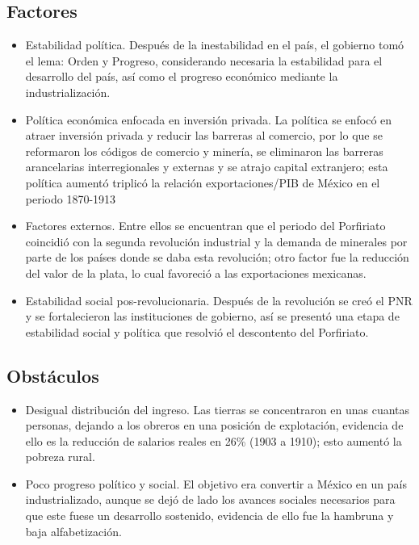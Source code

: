 \subsection{Factores}
\begin{itemize}
    \item Estabilidad política. Después de la inestabilidad en el país, el gobierno tomó el lema: Orden y Progreso, considerando necesaria la estabilidad para el desarrollo del país, así como el progreso económico mediante la industrialización.
    \item Política económica enfocada en inversión privada. La política se enfocó en atraer inversión privada y reducir las barreras al comercio, por lo que se reformaron los códigos de comercio y minería, se eliminaron las barreras arancelarias interregionales y externas y se atrajo capital extranjero; esta política aumentó triplicó la relación exportaciones/PIB de México en el periodo 1870-1913
    \item Factores externos. Entre ellos se encuentran que el periodo del Porfiriato coincidió con la segunda revolución industrial y la demanda de minerales por parte de los países donde se daba esta revolución; otro factor fue la reducción del valor de la plata, lo cual favoreció a las exportaciones mexicanas.
    \item Estabilidad social pos-revolucionaria. Después de la revolución se creó el PNR y se fortalecieron las instituciones de gobierno, así se presentó una etapa de estabilidad social y política que resolvió el descontento del Porfiriato.
\end{itemize}


\subsection{Obstáculos}
\begin{itemize}
    \item Desigual distribución del ingreso. Las tierras se concentraron en unas cuantas personas, dejando a los obreros en una posición de explotación, evidencia de ello es la reducción de salarios reales en 26\% (1903 a 1910); esto aumentó la pobreza rural.
    \item Poco progreso político y social. El objetivo era convertir a México en un país industrializado, aunque se dejó de lado los avances sociales necesarios para que este fuese un desarrollo sostenido, evidencia de ello fue la hambruna y baja alfabetización.
\end{itemize}


